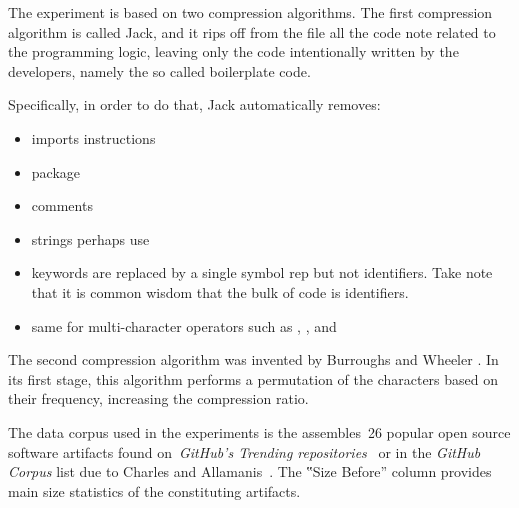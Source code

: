 
The experiment is based on two compression algorithms.
The first compression algorithm is called Jack, and it rips off from the file all the code note related to the programming logic, leaving
only the code intentionally written by the developers, namely the so called boilerplate code.

Specifically, in order to do that, Jack automatically removes:

\begin{itemize}
  \item imports instructions
  \item package
  \item comments
  \item strings perhaps use
  \item keywords are replaced by a single symbol rep
        but not identifiers. Take note that it is common wisdom that the bulk of code is identifiers.
  \item same for multi-character operators such as \cc{->}, \cc{[]}, and \cc{<<<<=}
\end{itemize}

The second compression algorithm was invented by Burroughs and Wheeler
\cite{Burrows:Wheeler:94}. In its first stage, this algorithm performs a
permutation of the characters based on their frequency, increasing the
compression ratio.

The data corpus used in the experiments is the assembles~26 popular \Java open
source software artifacts found on~\emph{GitHub's Trending
repositories}~ or in
the \emph{GitHub \Java Corpus} list due to Charles and
Allamanis~\cite{Charles:Allamanis:2013}.
The ‟Size Before” column  provides main size statistics of
the constituting artifacts.

\begin{table}
  \label{table:corpus}
  \caption{The results of the compression using the Burroughs-Wheeler algorithm}
  \centering
\end{table}

